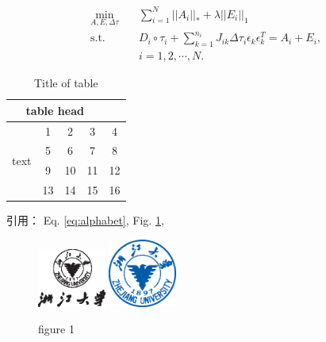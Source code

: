 \documentclass[UTF8,a4paper,10pt, twocolumn]{ctexart}
\begin{document}
	\begin{equation}
	\begin{aligned} \label{eq:rasl}
	\min_{A,E,\Delta \tau} \quad & \sum_{i=1}^{N}||A_i||_* + \lambda ||E_i||_1  \\
	\mathrm{s.t.} \quad & D_i \circ \tau_i + \sum_{k=1}^{n_i} J_{ik} \Delta \tau_i \epsilon_k \epsilon_k^T = A_i + E_i, \\
	& i = 1,2,\cdots,N. 
	\end{aligned}
	\end{equation}
	
	\begin{table}[htbp]
		\caption{Title of table} \label{tab:table}
		\centering
		\addtolength{\tabcolsep}{-0mm} %
		\begin{tabular}{ccccc}
			\toprule[0.75pt]	%
			\multicolumn{4}{c}{table head} \\
			\midrule[0.5pt]	%
			\multirow{4}{*}{text} & 1 & 2 & 3 & 4 \\  %
			& 5 & 6 & 7 & 8 \\
			\cmidrule[0.5pt]{2-4}	%
			& 9 & 10 & 11 & 12 \\
			& 13 & 14 & 15 & 16 \\
			\bottomrule[0.75pt]	%
		\end{tabular}
	\end{table}
	引用： Eq. \eqref{eq:alphabet}, Fig. \ref{figure:zju1},  \\
	\begin{figure}[htbp] 
		\centering
		\includegraphics[width=0.2\textwidth]{fig/ZJU_BLACK.eps}
		\includegraphics[width=0.2\textwidth]{fig/ZJU_BLUE.eps}
		\caption{figure 1}		
		\label{figure:zju1}
	\end{figure}
\end{document}
